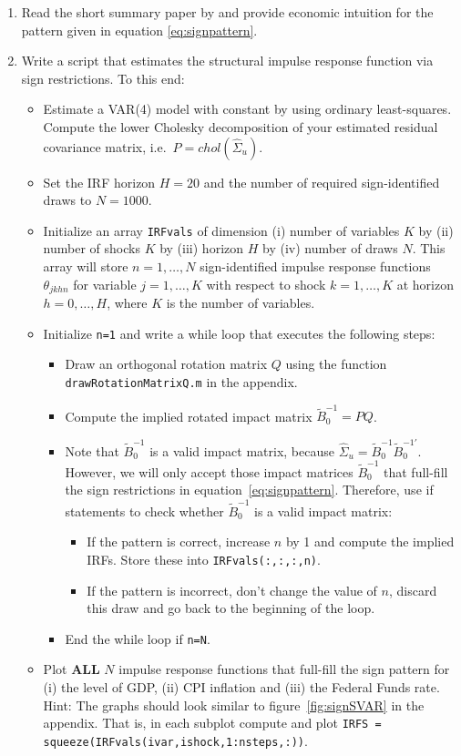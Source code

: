 \documentclass{article}
\begin{document}
\begin{enumerate}
\item Read the short summary paper by \textcite{Wolf_2022_WhatCanWe} and provide economic intuition for the pattern given in equation \eqref{eq:signpattern}.
\item Write a script that estimates the structural impulse response function via sign restrictions.
To this end:
\begin{itemize}
\item Estimate a VAR{(4)} model with constant by using ordinary least-squares.
Compute the lower Cholesky decomposition of your estimated residual covariance matrix, i.e.\ \( P = chol(\hat{\Sigma}_u) \).
\item Set the IRF horizon \(H=20\) and the number of required sign-identified draws to \(N=1000\).
\item Initialize an array \texttt{IRFvals} of dimension
(i) number of variables \(K\) by (ii) number of shocks \(K\) by (iii) horizon \(H\) by (iv) number of draws \(N\).
This array will store \(n=1,\ldots,N\) sign-identified impulse response functions \(\theta_{jkhn}\) for variable \(j=1,\ldots,K\)
  with respect to shock \(k=1,\ldots,K\) at horizon \(h=0,\ldots,H\), where \(K\) is the number of variables.

\item Initialize \texttt{n=1} and write a while loop that executes the following steps:
\begin{itemize}
  \item Draw an orthogonal rotation matrix \(Q\) using the function \texttt{drawRotationMatrixQ.m} in the appendix.
  \item Compute the implied rotated impact matrix \(\widetilde{B}_0^{-1}=PQ\).
  \item Note that \(\widetilde{B}_0^{-1}\) is a valid impact matrix, because \(\hat{\Sigma}_u = \widetilde{B}_0^{-1} \widetilde{B}_0^{-1'}\).
  However, we will only accept those impact matrices \(\widetilde{B}_0^{-1}\) that full-fill the sign restrictions in equation~\eqref{eq:signpattern}.
  Therefore, use if statements to check whether \(\widetilde{B}_0^{-1}\) is a valid impact matrix:
  \begin{itemize}
    \item If the pattern is correct, increase \(n\) by 1 and compute the implied IRFs. Store these into \texttt{IRFvals(:,:,:,n)}.
    \item If the pattern is incorrect, don't change the value of \(n\), discard this draw and go back to the beginning of the loop.
  \end{itemize}
  \item End the while loop if \texttt{n=N}.
\end{itemize}
\item Plot \textbf{ALL} \(N\) impulse response functions that full-fill the sign pattern for (i) the level of GDP, (ii) CPI inflation and (iii) the Federal Funds rate.
\\Hint: The graphs should look similar to figure~\ref{fig:signSVAR} in the appendix.
That is, in each subplot compute and plot \texttt{IRFS = squeeze(IRFvals(ivar,ishock,1:nsteps,:))}.	
\end{itemize}


\end{enumerate}
\end{document}
